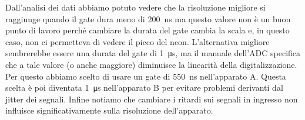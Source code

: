 Dall'analisi dei dati abbiamo potuto vedere che la risoluzione migliore si raggiunge quando il gate dura meno di \SI{200}{ns}
ma questo valore non è un buon punto di lavoro perché cambiare la durata del gate cambia la scala e, in questo caso, non ci permetteva di vedere il picco del neon.
L'alternativa migliore sembrerebbe essere una durata del gate di \SI{1}{\micro s}, ma il manuale dell'ADC specifica che a tale valore (o anche maggiore) diminuisce la linearità della digitalizzazione. Per questo abbiamo scelto di usare un gate di \SI{550}{ns} nell'apparato A.
Questa scelta è poi diventata \SI{1}{\micro s} nell'apparato B per evitare problemi derivanti dal jitter dei segnali. Infine notiamo che cambiare i ritardi sui segnali in ingresso non influisce significativamente sulla risoluzione dell'apparato.

